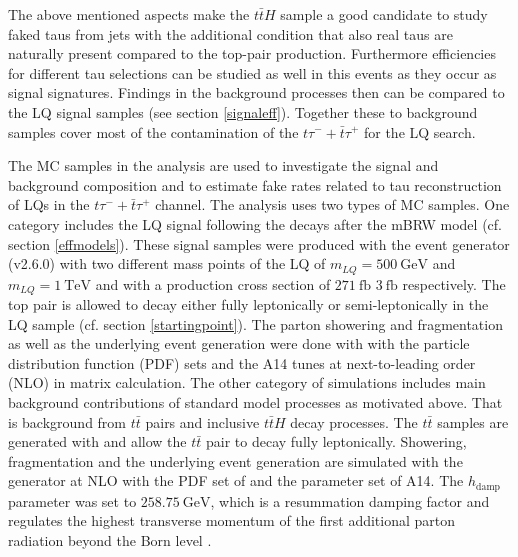 %
The above mentioned aspects make the $t\bar{t}H$ sample a good candidate to study faked taus from jets with the additional condition that also real taus are naturally present compared to the top-pair production. Furthermore efficiencies for different tau selections can be studied as well in this events as they occur as signal signatures. Findings in the background processes then can be compared to the LQ signal samples (see section \ref{signaleff}). \newline
Together these to background samples cover most of the contamination of the $t\tau^{-}+\bar{t}\tau^{+}$ for the LQ search.\par
The MC samples in the analysis are used to investigate the signal and background composition and to estimate fake rates related to tau reconstruction of LQs in the $t\tau^{-}+\bar{t}\tau^{+}$ channel. The analysis uses two types of MC samples. One category includes the LQ signal following the decays after the mBRW model (cf. section \ref{effmodels}). These signal samples were produced with the event generator {\aMCNLO} (v2.6.0) \cite{aMCNlo} with two different mass points of the LQ of $m_{LQ}=\SI{500}{\giga\electronvolt}$ and $m_{LQ}=\SI{1}{\tera\electronvolt}$ and with a production cross section of $\SI{271}{\femto\barn}$ $\SI{3}{\femto\barn}$ respectively. The top pair is allowed to decay either fully leptonically or semi-leptonically in the LQ sample (cf. section \ref{startingpoint}). The parton showering and fragmentation as well as the underlying event generation were done with {\Pythia} \cite{Pythia8} with the particle distribution function (PDF) sets {\NNPDFd} \cite{NNPDF} and the A14 \cite{A14} tunes at next-to-leading order (NLO) in matrix calculation. \newline         
The other category of simulations includes main background contributions of standard model processes as motivated above. That is background from $t\bar{t}$ pairs and inclusive $t\bar{t}H$ decay processes. The $t\bar{t}$ samples are generated with {\POWHEG} \cite{Powheg} and allow the $t\bar{t}$ pair to decay fully leptonically. Showering, fragmentation and the underlying event generation are simulated with the generator {\Pythia} at NLO with the PDF set of {\NNPDFz} and the parameter set of A14. The $h_\text{damp}$ parameter was set to $\SI{258.75}{\giga\electronvolt}$, which is a resummation damping factor and regulates the highest transverse momentum of the first additional parton radiation beyond the Born level \cite{hdamp}\cite{hdamp2}.\newline
